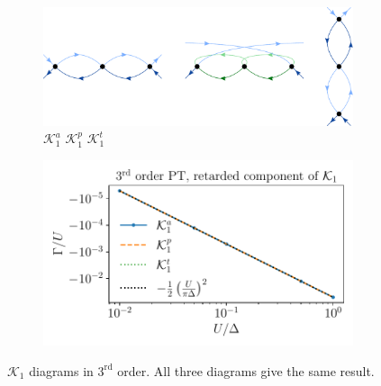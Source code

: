 \documentclass[10pt]{scrartcl}
\newcommand{\Ktot}[1]{\mathcal{K}_#1}
\newcommand{\K}[2]{\mathcal{K}_#1^#2}
\begin{document}
\begin{figure}[h!]
\begin{subfigure}[c]{0.4\textwidth}
\includegraphics[scale=0.3]{diagrams/PT3_K1}
\\
\phantom{.}\hspace{0.75cm} $\K1a$ \hspace{2cm} $\K1p$ \hspace{1cm} $\K1t$
\end{subfigure}
\begin{subfigure}[c]{0.4\textwidth}
\includegraphics[scale=0.65]{plots/PT3_K1}
\end{subfigure}
\caption{$\Ktot1$ diagrams in $3^\text{rd}$ order. All three diagrams give the same result.}
\end{figure}

\vspace{-0.5cm}
\end{document}

